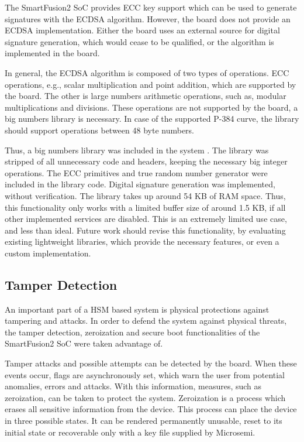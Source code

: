 The SmartFusion2 SoC provides ECC key support which can be used to generate signatures with the ECDSA algorithm. However, the board does not provide an ECDSA implementation. Either the board uses an external source for digital signature generation, which would cease to be qualified, or the algorithm is implemented in the board.

In general, the ECDSA algorithm is composed of two types of operations. ECC operations, e.g., scalar multiplication and point addition, which are supported by the board. The other is large numbers arithmetic operations, such as, modular multiplications and divisions. These operations are not supported by the board, a big numbers library is necessary. In case of the supported P-384 curve, the library should support operations between 48 byte numbers. 

Thus, a big numbers library was included in the system \cite{libecc}. The library was stripped of all unnecessary code and headers, keeping the necessary big integer operations. The ECC primitives and true random number generator were included in the library code. Digital signature generation was implemented, without verification. The library takes up around 54 KB of RAM space. Thus, this functionality only works with a limited buffer size of around 1.5 KB, if all other implemented services are disabled.
This is an extremely limited use case, and less than ideal. Future work should revise this functionality, by evaluating existing lightweight libraries, which provide the necessary features, or even a custom implementation.

\subsection{Tamper Detection}\label{chap:implementation:services:tamper-detection}

An important part of a HSM based system is physical protections against tampering and attacks.
In order to defend the system against physical threats, the tamper detection, zeroization and secure boot functionalities of the SmartFusion2 SoC were taken advantage of.

Tamper attacks and possible attempts can be detected by the board. When these events occur, flags are asynchronously set, which warn the user from potential anomalies, errors and attacks. With this information, measures, such as zeroization, can be taken to protect the system.
Zeroization is a process which erases all sensitive information from the device. This process can place the device in three possible states. It can be rendered permanently unusable, reset to its initial state or recoverable only with a key file supplied by Microsemi.

